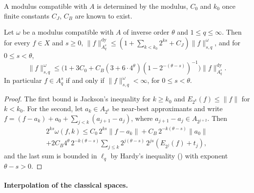 A modulus compatible with $A$ is determined by the modulus, $C_0$ and $k_0$ once finite
constants $C_J$, $C_B$ are known to exist.

\begin{theorem}
\label{thm:modulus-coincidence}
\leanok
{}
Let $\omega$ be a modulus compatible with $A$ of inverse order $\theta$ and $1 \leq q \leq
\infty$. Then for every $f \in X$ and $s \geq 0$,
$\|f\|^{\mathrm{dy}}_{A^s_q} \leq (1 + \sum_{k < k_0} 2^{ks} + C_J) \|f\|^{\omega}_{s,q}$, and
for $0 \leq s < \theta$,
\[
  \|f\|^{\omega}_{s,q} \leq \bigl(1 + 3 C_0 + C_B (3 + 6 \cdot 4^{\theta})
  (1 - 2^{-(\theta - s)})^{-1}\bigr) \|f\|^{\mathrm{dy}}_{A^s_q} .
\]
In particular $f \in A^s_q$ if and only if $\|f\|^{\omega}_{s,q} < \infty$, for $0 \leq s < \theta$.
\end{theorem}

\begin{proof}
\leanok
The first bound is Jackson's inequality for $k \geq k_0$ and $E_{2^k}(f) \leq \|f\|$ for
$k < k_0$. For the second,
let $a_k \in A_{2^k}$ be near-best approximants and write
$f = (f - a_k) + a_0 + \sum_{j < k} (a_{j+1} - a_j)$, where $a_{j+1} - a_j \in A_{2^{j+2}}$. Then
\begin{multline*}
  2^{ks} \omega(f, k) \leq C_0 \, 2^{ks} \|f - a_k\| + C_B \, 2^{-k(\theta - s)} \|a_0\| \\
  + 2 C_B 4^{\theta} \, 2^{-k(\theta - s)} \sum_{j \leq k} 2^{j(\theta - s)} \,
  2^{js} (E_{2^j}(f) + t_j),
\end{multline*}
and the last sum is bounded in $\ell_q$ by Hardy's inequality () with exponent
$\theta - s > 0$.
\end{proof}

\paragraph{Interpolation of the classical spaces.}

